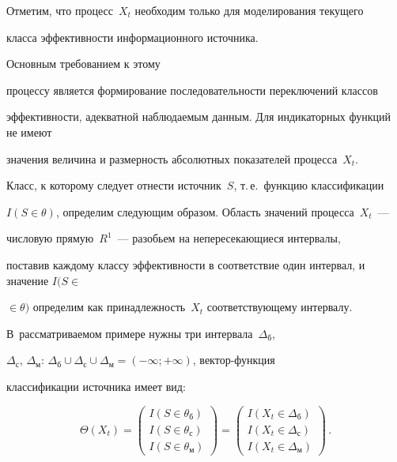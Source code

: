       


      Отметим, что процесс~$X_t$ необходим только для моде\-ли\-ро\-вания текущего 


класса эффективности информационного источника. 





Основным требованием к этому 


процессу является формирование последовательности переключений классов


эффективности, адекватной наблюдаемым данным. Для индикаторных функций не имеют 


значения величина и размерность абсолютных показателей процесса~$X_t$.


      


      Класс, к которому следует отнести источник~$S$, т.\,е.\ функцию классификации 


$I(S\in\theta)$, определим следующим образом. Область значений процесса~$X_t$~--- 


числовую прямую~$R^1$~--- разобьем на непересекающиеся интервалы, 


поставив каждому классу эффективности в соответствие один интервал, и значение $I(S\in$\linebreak 


$\in  \theta)$ определим как принадлежность~$X_t$ соответствующему интервалу. 


В~рассматриваемом примере нужны три интервала~$\Delta_{\mathrm{б}}$, 


$\Delta_{\mathrm{с}}$, $\Delta_{\mathrm{м}}$:  $\Delta_{\mathrm{б}}\cup 


\Delta_{\mathrm{с}}\cup \Delta_{\mathrm{м}}=(-\infty;+\infty)$, век\-тор-функ\-ция 


классификации источника имеет вид:


      \begin{equation*}


      \Theta(X_t)=


      \begin{pmatrix}


      I(S\in \theta_{\mathrm{б}})\\


      I(S\in \theta_{\mathrm{с}})\\ I(S\in \theta_{\mathrm{м}})


      \end{pmatrix}=


      \begin{pmatrix}


      I(X_t\in \Delta_{\mathrm{б}})\\


      I(X_t\in \Delta_{\mathrm{с}})\\


      I(X_t\in \Delta_{\mathrm{м}})


      \end{pmatrix}\,.




      \end{equation*}


